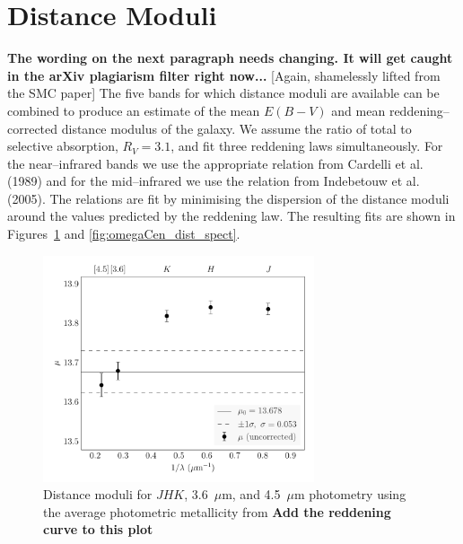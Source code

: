\documentclass[a4paper,fleqn,usenatbib]{mnras}
\begin{document}
\section{Distance Moduli}
\label{sec:distance_moduli}
{\bf The wording on the next paragraph needs changing. It will get caught in the arXiv plagiarism filter right now...}
[Again, shamelessly lifted from the SMC paper]
The five bands for which distance moduli are available can be combined to produce an estimate of the mean $E(B - V)$ and mean reddening--corrected distance modulus of the galaxy. We assume the ratio of total to selective absorption, $R_V = 3.1$, and fit three reddening laws simultaneously. For the near--infrared bands we use the appropriate relation from Cardelli et al. (1989) and for the mid--infrared we use the relation from Indebetouw et al. (2005). The relations are fit by minimising the dispersion of the distance moduli around the values predicted by the reddening law. The resulting fits are shown in Figures~\ref{fig:omegaCen_dist_phot} and \ref{fig:omegaCen_dist_spect}.

\begin{figure}
\begin{center}
\includegraphics[width=80mm]{final_plots/multiwavelength_distance_samestars_phot.pdf}
\caption{Distance moduli for $J\!H\!K$, 3.6~$\mu$m, and 4.5~$\mu$m photometry using the average photometric metallicity from \citet{2000AJ....119.1824R} {\bf Add the reddening curve to this plot}}
\label{fig:omegaCen_dist_phot}
\end{center}
\end{figure}
\end{document}
